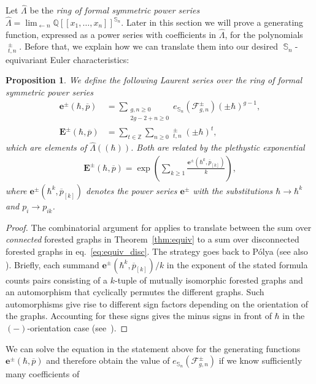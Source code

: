 \documentclass[oneside]{amsart}
\newtheorem{proposition}[theorem]{Proposition}
\theoremstyle{remark}
\newcommand{\bb}[1]{{\overline{#1}}}
\newcommand{\Q}{\mathbb{Q}}
\newcommand{\Z}{\mathbb{Z}}
\DeclareMathOperator{\SG}{{\mathbb S}}
\DeclareMathOperator{\ee}{\widehat{e}}
\newcommand{\F}{\mathcal{F}}
\begin{document}
Let $\widehat \Lambda$ be the \emph{ring of formal symmetric power series}
$\widehat \Lambda = \lim_{\leftarrow n} \Q[[x_1,\ldots,x_n]]^{\SG_n}$.
Later in this section we will prove a generating function,
expressed as a power series with coefficients in $\widehat \Lambda$,
 for the polynomials $\ee_{t,n}^\pm$. 
Before that, we explain how we can translate them into our desired $\SG_n$-equivariant Euler characteristics:
%
%
%
%
%
%
%
%
%
%
%
%
%
%
%
%
\begin{proposition}
\label{prop:exp}
We define the following Laurent series over the ring of formal symmetric power series 
\begin{align*} \mathbf e^\pm(\hbar, \bb p) &= \sum_{\substack{ g,n \geq 0\\ 2g-2+n \geq 0}} e_{\SG_n}(\F^\pm_{g,n}) (\pm \hbar)^{g-1}, \\
\mathbf E^\pm(\hbar, \bb p) &= \sum_{t\in \Z} \sum_{n \geq 0} \ee_{t,n}^\pm (\pm \hbar)^t, \end{align*}
which are elements of $\widehat{ \Lambda}((\hbar))$.
Both are related by the \emph{plethystic exponential}
\begin{align*} \mathbf E^\pm(\hbar, \bb p) = \exp\left( \sum_{k \geq 1} \frac{\mathbf e^\pm(\hbar^k, \bb p_{[k]})}{k} \right), \end{align*}
where $\mathbf e^\pm(\hbar^k, \bb p_{[k]})$ denotes the power series $\mathbf e^\pm$ with the substitutions $\hbar \rightarrow \hbar^k$ and $p_{i} \rightarrow p_{ik}$.
\end{proposition}
\begin{proof} 
%
The combinatorial argument for \cite[Proposition~3.2]{BV2} applies to
translate between the sum over \emph{connected} forested graphs in Theorem~\ref{thm:equiv}
to a sum over disconnected forested graphs in eq.~\eqref{eq:equiv_disc}.
The strategy goes back to P\'olya \cite{polya1937} (see also \cite[Chapter~4.3]{BLL}). 
Briefly, each summand 
${\mathbf e^\pm(\hbar^k, \bb p_{[k]})/k}$ in
the exponent of the stated formula 
counts pairs consisting of a $k$-tuple of mutually isomorphic forested graphs
and an automorphism that cyclically permutes the different graphs.
Such automorphisms give rise to different sign factors depending on the orientation of the graphs. Accounting for these signs gives the minus signs in front of $\hbar$ in the $(-)$-orientation case (see~\cite[Theorem~5.1]{BV2}). 
\end{proof}
We can solve the equation in the statement above for the generating functions $\mathbf e^\pm(\hbar, \bb p)$ 
and therefore obtain the value of $e_{\SG_n}(\F^\pm_{g,n})$ if we know sufficiently many coefficients of 
\end{document}
